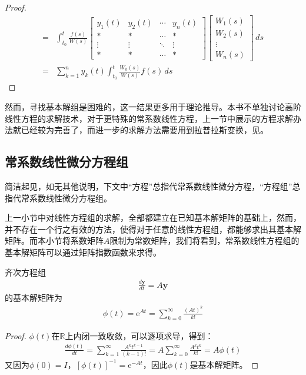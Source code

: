 \begin{proof}
\begin{align*}
        =&\int_{t_0}^t \frac{f(s)}{W(s)}\begin{bmatrix}
        y_1(t) & y_2(t) & \cdots & y_n(t)\\
        * & * & \cdots & *\\
        \vdots & \vdots & \ddots & \vdots\\
        * & * & \cdots & *
        \end{bmatrix}\begin{bmatrix}
        W_1(s)\\
        W_2(s)\\
        \vdots\\
        W_n(s)
        \end{bmatrix}\,ds\\
        =&\sum_{k=1}^n y_k(t)\int_{t_0}^t \frac{W_k(s)}{W(s)}f(s)\,ds
    \end{align*}
\end{proof}

然而，寻找基本解组是困难的，这一结果更多用于理论推导。本书不单独讨论高阶线性方程的求解技术，对于更特殊的常系数线性方程，上一节中展示的方程求解办法就已经较为完善了，而进一步的求解方法需要用到拉普拉斯变换，见。%

\subsection{常系数线性微分方程组}\label{sub:constant_coefficient_linear_equation_system}

简洁起见，如无其他说明，下文中“方程”总指代常系数线性微分方程，“方程组”总指代常系数线性微分方程组。

上一小节中对线性方程组的求解，全部都建立在已知基本解矩阵的基础上，然而，并不存在一个行之有效的方法，使得对于任意的线性方程组，都能够求出其基本解矩阵。而本小节将系数矩阵$A$限制为常数矩阵，我们将看到，常系数线性方程组的基本解矩阵可以通过矩阵指数函数来求得。

\begin{theorem}
    齐次方程组\begin{align*}
    \frac{d\mathbf{y}}{dt}=A\mathbf{y}
    \end{align*}
    的基本解矩阵为\begin{align*}
    \phi(t)=\mathrm{e}^{At}=\sum_{k=0}^{\infty}\frac{(At)^k}{k!}
    \end{align*}
\end{theorem}
\begin{proof}
    $\phi(t)$在$\mathbb{R}$上内闭一致收敛，可以逐项求导，得到：
    \begin{align*}
    \frac{d\phi(t)}{dt}=\sum_{k=1}^{\infty}\frac{A^k t^{k-1}}{(k-1)!}=A\sum_{k=0}^{\infty}\frac{A^k t^k}{k!}=A\phi(t)
    \end{align*}
    又因为$\phi(0)=I$，$[\phi(t)]^{-1}=\mathrm{e}^{-At}$，因此$\phi(t)$是基本解矩阵。
\end{proof}

